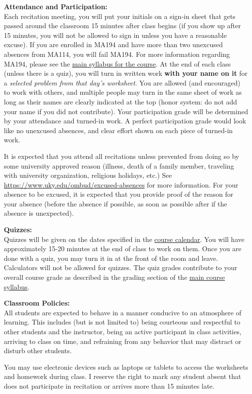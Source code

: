\documentclass[12pt]{article}
\newcommand{\tbf}[1]{\noindent\textbf{#1}}
\begin{document}
\tbf{Attendance and Participation:}\\
Each recitation meeting, you will put your initials on a sign-in sheet that gets passed around the classroom 15 minutes after class begins (if you show up after 15 minutes, you will not be allowed to sign in unless you have a reasonable excuse). If you are enrolled in MA194 and have more than two unexcused absences from MA114, you will fail MA194. For more information regarding MA194, please see the \href{http://www.ms.uky.edu/~ma114/f.22/}{main syllabus for the course}. At the end of each class (unless there is a quiz), you will turn in written work \textbf{with your name on it} for a \textit{selected problem from that day's worksheet}. You are allowed (and encouraged) to work with others, and multiple people may turn in the same sheet of work as long as their names are clearly indicated at the top (honor system: do not add your name if you did not contribute). Your participation grade will be determined by your attendance and turned-in work. A perfect participation grade would look like no unexcused absences, and clear effort shown on each piece of turned-in work.\par
It is expected that you attend all recitations unless prevented from doing so by some university approved reason (illness, death of a family member, traveling with university organization, religious holidays, etc.) See \url{https://www.uky.edu/ombud/excused-absences} for more information. For your absence to be excused, it is expected that you provide proof of the reason for your absence (before the absence if possible, as soon as possible after if the absence is unexpected).

\vspace{0.5cm}


\tbf{Quizzes:}\\
Quizzes will be given on the dates specified in the \href{http://www.ms.uky.edu/~ma114/f.22/#calendar}{course calendar}. You will have approximately 15-20 minutes at the end of class to work on them. Once you are done with a quiz, you may turn it in at the front of the room and leave. Calculators will not be allowed for quizzes. The quiz grades contribute to your overall course grade as described in the grading section of the \href{http://www.ms.uky.edu/~ma114/f.22}{main course syllabus}.

\vspace{0.5cm}

\tbf{Classroom Policies:}\\
All students are expected to behave in a manner conducive to an atmosphere of learning. This includes (but is not limited to) being courteous and respectful to other students and the instructor, being an active participant in class activities, arriving to class on time, and refraining from any behavior that may distract or disturb other students. \par You may use electronic devices such as laptops or tablets to access the worksheets and homework during class. I reserve the right to mark any student absent that does not participate in recitation or arrives more than 15 minutes late.
\end{document}
